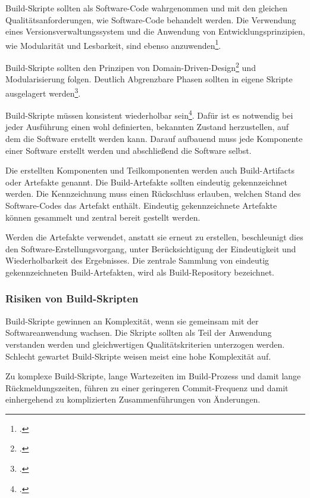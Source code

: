 Build-Skripte sollten als Software-Code wahrgenommen und mit den gleichen Qualitätsanforderungen, wie Software-Code behandelt werden. Die Verwendung eines Versionsverwaltungssystem und die Anwendung von Entwicklungsprinzipien, wie Modularität und Lesbarkeit, sind ebenso anzuwenden\footcite[vgl.][Kap. Build and Deployment Scripting]{humble2010}.

Build-Skripte sollten den Prinzipen von Domain-Driven-Design\footcite[vgl.][The Building Blocks of a Model-Driven Design]{evans-domain-driven} und Modularisierung folgen. Deutlich Abgrenzbare Phasen sollten in eigene Skripte ausgelagert werden\footcite[vgl.][Kap. Principles and Practices of Build and Deployment Scripting]{humble2010}.

Build-Skripte müssen konsistent wiederholbar sein\footcite[vgl.][Sektion: Ensure the Deployment Process Is Idempotent]{humble2010}. Dafür ist es notwendig bei jeder Ausführung einen wohl definierten, bekannten Zustand herzustellen, auf dem die Software erstellt werden kann. Darauf aufbauend muss jede Komponente einer Software erstellt werden und abschließend die Software selbst.

Die erstellten Komponenten und Teilkomponenten werden auch \glqq Build-Artifacts\grqq{} oder Artefakte genannt. Die Build-Artefakte sollten eindeutig gekennzeichnet werden. Die Kennzeichnung muss einen Rückschluss erlauben, welchen Stand des Software-Codes das Artefakt enthält. 
Eindeutig gekennzeichnete Artefakte können gesammelt und zentral bereit gestellt werden. 

Werden die Artefakte verwendet, anstatt sie erneut zu erstellen, beschleunigt dies den Software-Erstellungsvorgang, unter Berücksichtigung der Eindeutigkeit und Wiederholbarkeit des Ergebnisses. 
Die zentrale Sammlung von eindeutig gekennzeichneten Build-Artefakten, wird als \glqq Build-Repository\grqq{} bezeichnet.

\subsubsection{Risiken von Build-Skripten}

Build-Skripte gewinnen an Komplexität, wenn sie gemeinsam mit der Softwareanwendung wachsen. Die Skripte sollten als Teil der Anwendung verstanden werden und gleichwertigen Qualitätskriterien unterzogen werden. Schlecht gewartet Build-Skripte weisen meist eine hohe Komplexität auf.

Zu komplexe Build-Skripte, lange Wartezeiten im Build-Prozess und damit lange Rückmeldungszeiten, führen zu einer geringeren Commit-Frequenz und damit einhergehend zu komplizierten Zusammenführungen von Änderungen. 

